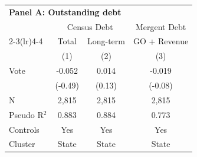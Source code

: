 \begingroup
\centering
\begin{tabular*}{\textwidth}{@{\extracolsep{\fill}}lccc}
\multicolumn{3}{l}{\textbf{Panel A: Outstanding debt}}\\

\addlinespace
   \toprule
                & \multicolumn{2}{c}{Census Debt} & \multicolumn{1}{c}{Mergent Debt}\\  
   \cmidrule(lr){2-3}\cmidrule(lr){4-4}
                & Total             & Long-term             & GO + Revenue \\   
                & (1)               & (2)                   & (3)\\  
   \midrule 
   Vote         & -0.052            & 0.014                 & -0.019\\   
                & (-0.49)          & (0.13)               & (-0.08)\\   
   \hline
   N & 2,815             & 2,815                 & 2,815\\  
   Pseudo R$^2$ & 0.883             & 0.884                 & 0.773\\  
   Controls                   & Yes & Yes & Yes\\
   Cluster              & State & State & State\\  
   \bottomrule
\end{tabular*}
\par\endgroup
